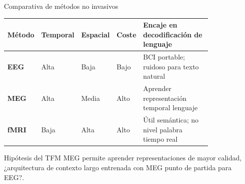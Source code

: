\documentclass[aspectratio=169,10pt]{beamer}
\begin{document}
\begin{frame}[c]{Comparativa de métodos no invasivos}
  \small
  \setlength{\tabcolsep}{4pt}
  \renewcommand{\arraystretch}{1.25}
  \begin{center}
  \begin{tabular}{>{\bfseries}p{0.10\linewidth}>{\centering\arraybackslash}p{0.12\linewidth}>{\centering\arraybackslash}p{0.12\linewidth}>{\centering\arraybackslash}p{0.10\linewidth}p{0.38\linewidth}}
    \toprule
    Método & Temporal & Espacial & Coste & Encaje en decodificación de lenguaje \\
    \midrule
    EEG & Alta & Baja & Bajo & BCI portable; ruidoso para texto natural \\
    MEG & Alta & Media & Alto & Aprender representación temporal lenguaje \\
    fMRI & Baja & Alta & Alto & Útil semántica; no nivel palabra tiempo real \\
    \bottomrule
  \end{tabular}
  \end{center}

  \vspace{4mm}

  \begin{alertblock}{Hipótesis del TFM}
    MEG permite aprender representaciones de mayor calidad, ¿arquitectura de contexto largo entrenada con MEG punto de partida para EEG?.
  \end{alertblock}

\end{frame}
\end{document}
